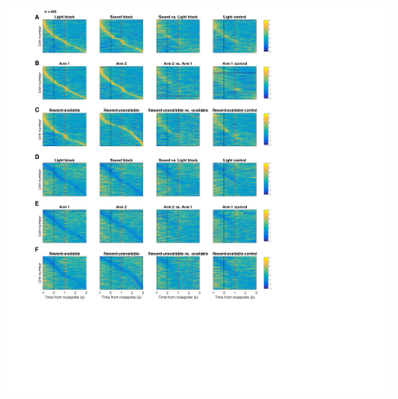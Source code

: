 \documentclass[11pt]{article}
\providecommand{\DIFaddbeginFL}{} %
\providecommand{\DIFdelbeginFL}{} %
\providecommand{\DIFdelendFL}{} %
\newcommand{\DIFscaledelfig}{0.5}
\newlength{\DIFdelgraphicswidth} %
\newlength{\DIFdelgraphicsheight} %
\newcommand{\DIFaddincludegraphics}[2][]{{\color{blue}\fbox{\DIFOincludegraphics[#1]{#2}}}} %
\newcommand{\DIFdelincludegraphics}[2][]{%
\sbox{\DIFdelgraphicsbox}{\DIFOincludegraphics[#1]{#2}}%
\settoboxwidth{\DIFdelgraphicswidth}{\DIFdelgraphicsbox} %
\settoboxtotalheight{\DIFdelgraphicsheight}{\DIFdelgraphicsbox} %
\scalebox{\DIFscaledelfig}{%
\parbox[b]{\DIFdelgraphicswidth}{\usebox{\DIFdelgraphicsbox}\\[-\baselineskip] \rule{\DIFdelgraphicswidth}{0em}}\llap{\resizebox{\DIFdelgraphicswidth}{\DIFdelgraphicsheight}{%
\setlength{\unitlength}{\DIFdelgraphicswidth}%
\begin{picture}(1,1)%
\thicklines\linethickness{2pt} %
{\color[rgb]{1,0,0}\put(0,0){\framebox(1,1){}}}%
{\color[rgb]{1,0,0}\put(0,0){\line( 1,1){1}}}%
{\color[rgb]{1,0,0}\put(0,1){\line(1,-1){1}}}%
\end{picture}%
}\hspace*{3pt}}} %
} %
\DeclareRobustCommand{\DIFaddbeginFL}{\DIFOaddbeginFL \let\includegraphics\DIFaddincludegraphics} %
\DeclareRobustCommand{\DIFdelbeginFL}{\DIFOdelbeginFL \let\includegraphics\DIFdelincludegraphics} %
\DeclareRobustCommand{\DIFdelendFL}{\DIFOaddendFL \let\includegraphics\DIFOincludegraphics} %
\begin{document}
\begin{figure}
[h]
\centering
\DIFdelbeginFL %
\DIFdelendFL \DIFaddbeginFL \includegraphics[height=0.5\textheight]{Fig 12 - NP task tiling.png}

\end{figure}
\end{document}
